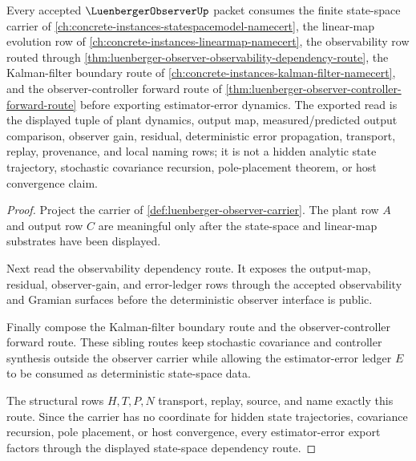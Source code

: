 \begin{theorem}
\label{thm:luenberger-observer-state-space-dependency-route}
Every accepted $\LuenbergerObserverUp$ packet consumes the finite state-space carrier of \autoref{ch:concrete-instances-statespacemodel-namecert}, the linear-map evolution row of \autoref{ch:concrete-instances-linearmap-namecert}, the observability row routed through \autoref{thm:luenberger-observer-observability-dependency-route}, the Kalman-filter boundary route of \autoref{ch:concrete-instances-kalman-filter-namecert}, and the observer-controller forward route of \autoref{thm:luenberger-observer-controller-forward-route} before exporting estimator-error dynamics. The exported read is the displayed tuple of plant dynamics, output map, measured/predicted output comparison, observer gain, residual, deterministic error propagation, transport, replay, provenance, and local naming rows; it is not a hidden analytic state trajectory, stochastic covariance recursion, pole-placement theorem, or host convergence claim.
\end{theorem}
\begin{proof}
Project the carrier of \autoref{def:luenberger-observer-carrier}. The plant row $A$ and output row $C$ are meaningful only after the state-space and linear-map substrates have been displayed.

Next read the observability dependency route. It exposes the output-map, residual, observer-gain, and error-ledger rows through the accepted observability and Gramian surfaces before the deterministic observer interface is public.

Finally compose the Kalman-filter boundary route and the observer-controller forward route. These sibling routes keep stochastic covariance and controller synthesis outside the observer carrier while allowing the estimator-error ledger $E$ to be consumed as deterministic state-space data.

The structural rows $H,T,P,N$ transport, replay, source, and name exactly this route. Since the carrier has no coordinate for hidden state trajectories, covariance recursion, pole placement, or host convergence, every estimator-error export factors through the displayed state-space dependency route.
\end{proof}
